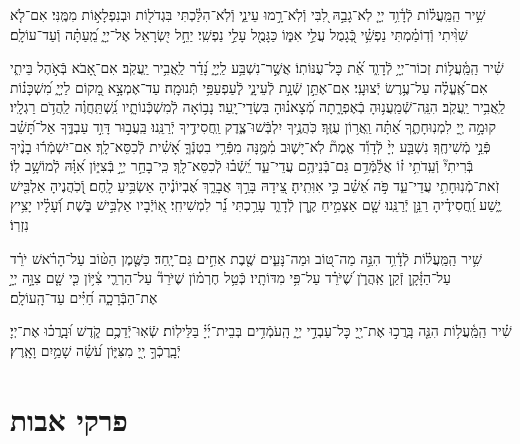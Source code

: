 \documentclass[twoside, openany, parskip=half, 11pt]{book}
\begin{document}
שִׁ֥יר הַֽמַּֽעֲל֗וֹת לְֿדָ֫וִ֥ד יְיָ֤ לֹֽא־גָבַ֣הּ לִ֭בִּי וְֿלֹֽא־רָ֣מוּ עֵינַ֑י וְֿלֹֽא־הִלַּ֓כְתִּי בִּגְדֹל֖וֹת וּבְנִפְלָא֣וֹת מִמֶּֽנִּי׃ אִם־לֹ֤א שִׁוִּ֨יתִי וְֿדֽוֹמַ֗מְתִּי נַפְשִׁ֥֗י כְּֿ֭גָמֻל עֲלֵ֣י אִמּ֑וֹ כַּגָּמֻ֖ל עָלַ֣י נַפְשִֽׁי׃ יַחֵ֣ל יִ֭שְׂרָאֵל אֶל־יְיָ֑ מֵֽ֝עַתָּ֗ה וְֿעַד־עוֹלָֽם׃

שִׁ֗יר הַֽמַּֽ֫עֲל֥וֹת זְכוֹר־יְיָ֥ לְֿדָוִ֑ד אֵ֝֗ת כׇּל־עֻנּוֹתֽוֹ׃ אֲשֶׁ֣ר־נִשְׁבַּ֥ע לַֽיְיָ֑ נָ֝דַ֗ר לַֽאֲבִ֥יר יַֽעֲקֹֽב׃ אִם־אָ֭בֹא בְּֿאֹ֣הֶל בֵּיתִ֑י אִם־אֶֽ֝עֱלֶ֗ה עַל־עֶ֥רֶשׂ יְֿצוּעָֽי׃ אִם־אֶתֵּ֣ן שְֿׁנָ֣ת לְֿעֵינָ֑י לְֽֿעַפְעַפַּ֥י תְּֿנוּמָֽה׃ עַד־אֶמְצָ֣א מָ֭קוֹם לַיְיָ֑ מִ֝שְׁכָּנ֗וֹת לַֽאֲבִ֥יר יַֽעֲקֹֽב׃ הִנֵּֽה־שְֿׁמַֽעֲנ֥וּהָ בְֿאֶפְרָ֑תָה מְֿ֝צָאנ֗וּהָ בִּשְׂדֵי־יָֽעַר׃ נָב֥וֹאָה לְֿמִשְׁכְּֿנוֹתָ֑יו נִֽ֝שְׁתַּֽחֲוֶ֗ה לַֽהֲדֹ֥ם רַגְלָֽיו׃ קוּמָ֣ה יְ֖יָ לִמְנֽוּחָתֶ֑ךָ אַ֝תָּ֗ה וַֽאֲר֥וֹן עֻזֶּֽךָ׃ כֹּֽהֲנֶ֥יךָ יִלְבְּֿשׁוּ־צֶ֑דֶק וַֽחֲסִידֶ֥יךָ יְֿרַנֵּֽנוּ׃ בַּֽעֲב֣וּר דָּוִ֣ד עַבְדֶּ֑ךָ אַל־תָּ֝שֵׁ֗ב פְּֿנֵ֣י מְֿשִׁיחֶֽךָ׃ נִשְׁבַּ֤ע יְיָ֨ לְֿדָוִ֡ד אֱמֶת֘ לֹֽא־יָשׁ֢וּב מִ֫מֶּ֥נָּה מִפְּֿרִ֥י בִטְנְֿךָ֑ אָ֝שִׁ֗ית לְֿכִסֵּא־לָֽךְ׃ אִם־יִשְׁמְֿר֬וּ בָנֶ֨יךָ בְּֿרִיתִי֘ וְֿעֵֽדֹתִ֥י ז֗וֹ אֲלַ֫מְּֿדֵ֥ם גַּם־בְּֿנֵיהֶ֥ם עֲדֵי־עַ֑ד יֵֽ֝שְֿׁב֗וּ לְֿכִסֵּא־לָֽךְ׃ כִּֽי־בָחַ֣ר יְיָ֣ בְּֿצִיּ֑וֹן אִ֝וָּ֗הּ לְֿמוֹשָׁ֥ב לֽוֹ׃ זֹֽאת־מְֿנֽוּחָתִ֥י עֲדֵי־עַ֑ד פֹּ֣ה אֵ֝שֵׁ֗ב כִּ֣י אִוִּתִֽיהָ׃ צֵ֭ידָהּ בָּרֵ֣ךְ אֲבָרֵ֑ךְ אֶ֝בְיוֹנֶ֗יהָ אַשְׂבִּ֥יעַ לָֽחֶם׃ וְֽֿ֭כֹֽהֲנֶיהָ אַלְבִּ֖ישׁ יֶ֑שַׁע וַֽ֝חֲסִידֶ֗יהָ רַנֵּ֥ן יְֿרַנֵּֽנוּ׃ שָׁ֤ם אַצְמִ֣יחַ קֶ֣רֶן לְֿדָוִ֑ד עָרַ֥כְתִּי נֵ֝֗ר לִמְשִׁיחִֽי׃ אֽ֭וֹיְֿבָיו אַלְבִּ֣ישׁ בֹּ֑שֶׁת וְֿ֝עָלָ֗יו יָצִ֥יץ נִזְרֽוֹ׃

שִׁ֥יר הַֽמַּֽעֲל֗וֹת לְֿדָ֫וִ֥ד הִנֵּ֣ה מַה־טּ֭וֹב וּמַה־נָּעִ֑ים שֶׁ֖בֶת אַחִ֣ים גַּם־יָֽחַד׃ כַּשֶּׁ֤מֶן הַטּ֨וֹב עַל־הָרֹ֗אשׁ יֹרֵ֗ד עַל־הַזָּ֫קָ֥ן זְֿקַ֥ן אַֽהֲרֹ֑ן שֶׁ֝יֹּרֵ֗ד עַל־פִּ֥י מִדּוֹתָֽיו׃ כְּֿטַ֥ל חֶרְמ֗וֹן שֶׁיֹּרֵד֘ עַל־הַרְרֵ֢י צִ֫יּ֥וֹן כִּ֤י שָׁ֤ם צִוָּ֣ה יְיָ֣ אֶת־הַבְּֿרָכָ֑ה חַ֝יִּ֗ים עַד־הָֽעוֹלָֽם׃

שִׁ֗יר הַֽמַּֽ֫עֲל֥וֹת הִנֵּ֤ה בָּֽרֲכ֣וּ אֶת־יְ֖יָ כׇּל־עַבְדֵ֣י יְיָ֑ הָֽעֹמְֿדִ֥ים בְּבֵית־יְ֜יָ֗ בַּלֵּילֽוֹת׃ שְֿׂאֽוּ־יְֿדֵכֶ֥ם קֹ֑דֶשׁ וּ֝בָֽרֲכ֗וּ אֶת־יְיָ׃ יְֿבָֽרֶכְֿךָ֣ יְ֖יָ מִצִּיּ֑וֹן עֹ֝שֵׂ֗ה שָׁמַ֥יִם וָאָֽרֶץ׃



\section[פרקי אבות]{ פרקי אבות }
\label{avos}

\newcommand{\kolyisroel}{
כָּל יִשְׂרָאֵל יֵשׁ לָהֶם חֵלֶק לְֿעוֹלָם הַבָּא, שֶׁנֶּאֱמַר וְֿעַמֵּךְ֙ \source{ישעשה ס}כֻּלָּ֣ם צַדִּיקִ֔ים לְֿעוֹלָ֖ם
יִ֣ירְֿשׁוּ אָ֑רֶץ נֵ֧צֶר מַטָּעַ֛י מַעֲשֵׂ֥ה יָדַ֖י לְֿהִתְפָּאֵֽר׃
}
\end{document}
